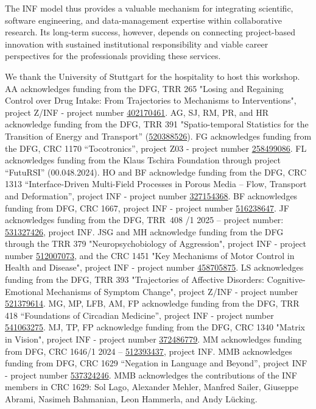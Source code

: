 \documentclass{eceasst}
\newcommand{\geprislink}[1]{\href{https://gepris.dfg.de/gepris/projekt/#1?language=en}{#1}}
\begin{document}
The INF model thus provides a valuable mechanism
for integrating scientific, software engineering,
and data-management expertise within collaborative
research. Its long-term success, however, depends
on connecting project-based innovation with
sustained institutional responsibility and
viable career perspectives for the professionals
providing these services.

\begin{acknowledge}
We thank the University of Stuttgart for the hospitality to host this workshop.
AA acknowledges funding from the DFG, TRR 265 "Losing and Regaining Control over Drug Intake: From Trajectories to Mechanisms to Interventions", project  Z/INF - project number \geprislink{402170461}.
AG, SJ, RM, PR, and HR acknowledge funding from the DFG, TRR 391 "Spatio-temporal Statistics for the Transition of Energy and Transport'' (\geprislink{520388526}).
FG acknowledges funding from the DFG, CRC 1170 “Tocotronics”, project Z03 - project number \geprislink{258499086}.
FL acknowledges funding from the Klaus Tschira Foundation through project “FutuRSI” (00.048.2024).
HO and BF acknowledge funding from the DFG, CRC 1313 “Interface-Driven Multi-Field Processes in Porous Media – Flow, Transport and Deformation”, project INF - project number \geprislink{327154368}.
BF acknowledges funding from DFG, CRC 1667, project INF - project number \geprislink{516238647}.
JF acknowledges funding from the DFG, TRR~408 /1 2025 – project number: \geprislink{531327426}, project INF.
JSG and MH acknowledge funding from the DFG through the TRR 379 "Neuropsychobiology of Aggression", project INF - project number \geprislink{512007073}, and the CRC 1451 "Key Mechanisms of Motor Control in Health and Disease", project INF - project number \geprislink{458705875}.
LS acknowledges funding from the DFG, TRR 393 "Trajectories of Affective Disorders: Cognitive-Emotional Mechanisms of Symptom Change", project  Z/INF - project number \geprislink{521379614}.
MG, MP, LFB, AM, FP acknowledge funding from the DFG, TRR 418 ``Foundations of Circadian Medicine'', project INF - project number \geprislink{541063275}.
MJ, TP, FP acknowledge funding from the DFG, CRC 1340 "Matrix in Vision", project INF - project number \geprislink{372486779}.
MM acknowledges funding from DFG, CRC 1646/1 2024 -- \geprislink{512393437}, project INF.
MMB acknowledges funding from DFG, CRC 1629 ``Negation in Language and Beyond'', project INF - project number \geprislink{537324246}.
MMB acknowledges the contributions of the INF members in CRC 1629: Sol Lago, Alexander Mehler, Manfred Sailer, Giuseppe Abrami, Nasimeh Bahmanian, Leon Hammerla, and Andy Lücking.

\end{acknowledge}
\end{document}
